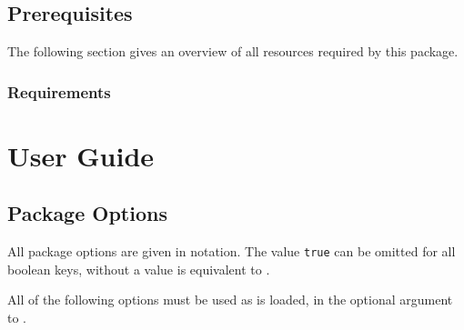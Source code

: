 \documentclass{ltxdockit}
\begin{document}
\subsection{Prerequisites}
\label{sec:intro:pre}

The following section gives an overview of all resources required by this package.

\subsubsection{Requirements}
\label{sec:intro:req}

\section{User Guide}
\label{sec:userguide}

\subsection{Package Options}
\label{sec:userguide:pkgopt}

All package options are given in \keyval notation.
The value \texttt{true} can be omitted for all boolean keys, \eg {} without a value is equivalent to .

All of the following options must be used as  is loaded, \ie in the optional argument to .
\end{document}
